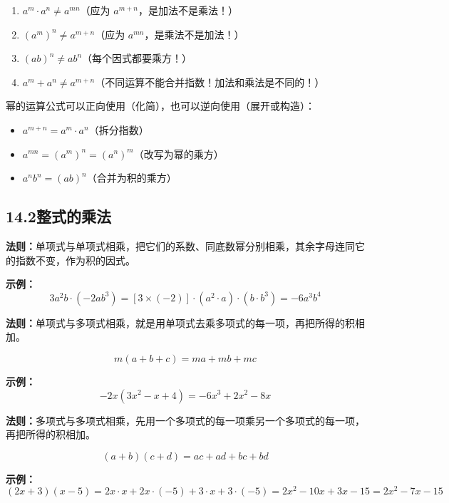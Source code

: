 \documentclass[12pt, a4paper]{ctexart}
\begin{document}
\begin{warnbox}
\begin{enumerate}[nosep]
  \item $a^m \cdot a^n \neq a^{mn}$（应为 $a^{m+n}$，是加法不是乘法！）
  \item $(a^m)^n \neq a^{m+n}$（应为 $a^{mn}$，是乘法不是加法！）
  \item $(ab)^n \neq ab^n$（每个因式都要乘方！）
  \item $a^m + a^n \neq a^{m+n}$（不同运算不能合并指数！加法和乘法是不同的！）
\end{enumerate}
\end{warnbox}

\begin{tipbox}[幂运算的逆向应用]
幂的运算公式可以正向使用（化简），也可以逆向使用（展开或构造）：
\begin{itemize}[nosep]
  \item $a^{m+n} = a^m \cdot a^n$（拆分指数）
  \item $a^{mn} = (a^m)^n = (a^n)^m$（改写为幂的乘方）
  \item $a^n b^n = (ab)^n$（合并为积的乘方）
\end{itemize}
\end{tipbox}

\subsection*{14.2\quad 整式的乘法}

\begin{knowledgebox}
\textbf{法则：}单项式与单项式相乘，把它们的系数、同底数幂分别相乘，其余字母连同它的指数不变，作为积的因式。

\textbf{示例：}
$$3a^2b \cdot (-2ab^3) = [3 \times (-2)] \cdot (a^2 \cdot a) \cdot (b \cdot b^3) = -6a^3b^4$$
\end{knowledgebox}

\begin{knowledgebox}
\textbf{法则：}单项式与多项式相乘，就是用单项式去乘多项式的每一项，再把所得的积相加。

$$\boxed{m(a + b + c) = ma + mb + mc}$$

\textbf{示例：}
$$-2x(3x^2 - x + 4) = -6x^3 + 2x^2 - 8x$$
\end{knowledgebox}

\begin{knowledgebox}
\textbf{法则：}多项式与多项式相乘，先用一个多项式的每一项乘另一个多项式的每一项，再把所得的积相加。

$$\boxed{(a + b)(c + d) = ac + ad + bc + bd}$$

\textbf{示例：}
$$(2x + 3)(x - 5) = 2x \cdot x + 2x \cdot (-5) + 3 \cdot x + 3 \cdot (-5) = 2x^2 - 10x + 3x - 15 = 2x^2 - 7x - 15$$
\end{knowledgebox}
\end{document}
